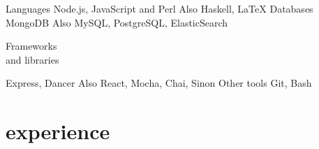 \documentclass[a4paper]{friggeri-cv}
\begin{document}
\begin{entrylist}
    \entry
        {Languages}
        {Node.js, JavaScript and Perl}
        {}
        {\small Also Haskell, \LaTeX}
        {}
    \entry
        {Databases}
        {MongoDB}
        {}
        {\small Also MySQL, PostgreSQL, ElasticSearch}
        {}
    \entry
    {\parbox[t][][t]{2.3cm}{Frameworks\\{\small and libraries}}}
        {Express, Dancer}
        {}
        {\small Also React, Mocha, Chai, Sinon}
        {}
    \entry
        {Other tools}
        {Git, Bash}
        {}
        {}
        {}
\end{entrylist}

\section{experience}
\end{document}
